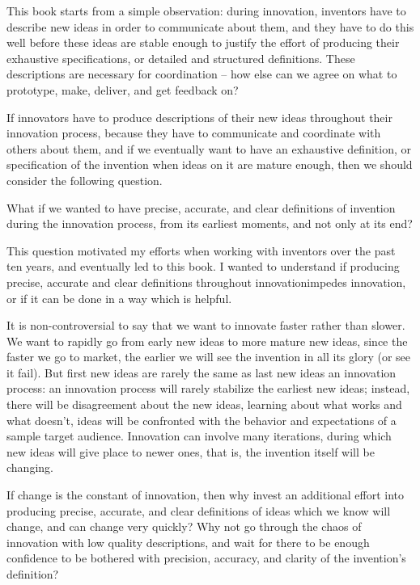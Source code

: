 \documentclass[graybox,envcountchap,sectrefs]{svmono}
\begin{document}
This book starts from a simple observation: during innovation, inventors have to describe new ideas in order to communicate about them, and they have to do this well before these ideas are stable enough to justify the effort of producing their exhaustive specifications, or detailed and structured definitions. These descriptions are necessary for coordination -- how else can we agree on what to prototype, make, deliver, and get feedback on?

If innovators have to produce descriptions of their new ideas throughout their innovation process, because they have to communicate and coordinate with others about them, and if we eventually want to have an exhaustive definition, or specification of the invention when ideas on it are mature enough, then we should consider the following question.

What if we wanted to have precise, accurate, and clear definitions of invention during the innovation process, from its earliest moments, and not only at its end? 

This question motivated my efforts when working with inventors over the past ten years, and eventually led to this book. I wanted to understand if producing precise, accurate and clear definitions throughout innovationimpedes innovation, or if it can be done in a way which is helpful. 

It is non-controversial to say that we want to innovate faster rather than slower. We want to rapidly go from early new ideas to more mature new ideas, since the faster we go to market, the earlier we will see the invention in all its glory (or see it fail). But first new ideas are rarely the same as last new ideas an innovation process: an innovation process will rarely stabilize the earliest new ideas; instead, there will be disagreement about the new ideas, learning about what works and what doesn't, ideas will be confronted with the behavior and expectations of a sample target audience. Innovation can involve many iterations, during which new ideas will give place to newer ones, that is, the invention itself will be changing. 

If change is the constant of innovation, then why invest an additional effort into producing precise, accurate, and clear definitions of ideas which we know will change, and can change very quickly? Why not go through the chaos of innovation with low quality descriptions, and wait for there to be enough confidence to be bothered with precision, accuracy, and clarity of the invention's definition?
\end{document}
